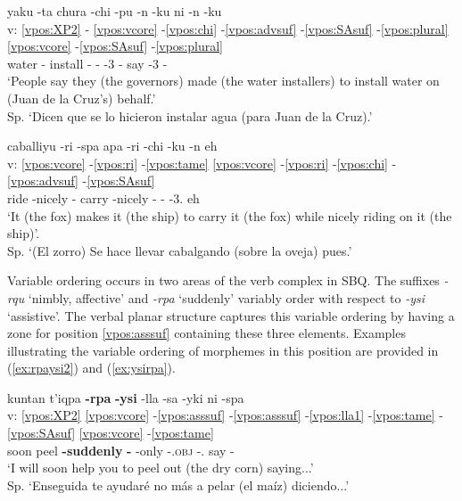 \documentclass[output=paper]{langscibook}
\begin{document}
\ea \label{ex:chipu}{
	\glll {} yaku -ta chura -chi -pu -n -ku ni -n -ku \\
	        v: \ref{vpos:XP2} - \ref{vpos:vcore} -\ref{vpos:chi} -\ref{vpos:advsuf} -\ref{vpos:SAsuf} -\ref{vpos:plural}  \ref{vpos:vcore} -\ref{vpos:SAsuf} -\ref{vpos:plural}  \\
		    {} water -\Acc{} install -\Caus{} -\Ben{} -3 -\Pl{} say -3 -\Pl{} \\
	\glt `People say they (the governors) made (the water installers) to install water on (Juan de la Cruz's) behalf.' \\ Sp. `Dicen que se lo hicieron instalar agua (para Juan de la Cruz).' \hfill }
\z

\ea \label{ex:richi}{
    \glll 	{} caballiyu -ri -spa apa -ri -chi -ku -n eh \\
		    v: \ref{vpos:vcore} -\ref{vpos:ri} -\ref{vpos:tame} \ref{vpos:vcore} -\ref{vpos:ri} -\ref{vpos:chi} -\ref{vpos:advsuf} -\ref{vpos:SAsuf} \\
			{} ride -nicely -\Gerund{} carry -nicely -\Caus{} -\Refl{} -3.\Sg{} eh \\
	\glt `It (the fox) makes it (the ship) to carry it (the fox) while nicely riding on it (the ship)'. \\ Sp. `(El zorro) Se hace llevar cabalgando (sobre la oveja) pues.' \hfill }
\z


Variable ordering occurs in two areas of the verb complex in SBQ. The suffixes \textit{-rqu} `nimbly, affective' and  \textit{-rpa} `suddenly' variably order with respect to \textit{-ysi} `assistive'. The verbal planar structure captures this variable ordering by having a zone for position \ref{vpos:asssuf} containing these three elements. Examples illustrating the variable ordering of morphemes in this position are provided in (\ref{ex:rpaysi2}) and (\ref{ex:ysirpa}).

\ea \label{ex:rpaysi2}{
	\glll {} kuntan t'iqpa \textbf{-rpa} \textbf{-ysi} -lla -sa -yki ni -spa 	\\
	    	v: \ref{vpos:XP2} \ref{vpos:vcore} -\ref{vpos:asssuf} -\ref{vpos:asssuf} -\ref{vpos:lla1} -\ref{vpos:tame} -\ref{vpos:SAsuf} \ref{vpos:vcore} -\ref{vpos:tame} \\
		    {} soon peel \textbf{-suddenly} \textbf{-\Assist{}} -only -\Second{}.\textsc{obj} -\First{}.\Sg{} say -\Gerund{} \\
	\glt `I will soon help you to peel out (the dry corn) saying...'\\ Sp. `Enseguida te ayudaré no más a pelar (el maíz) diciendo...' \hfill }  
\z
\end{document}
